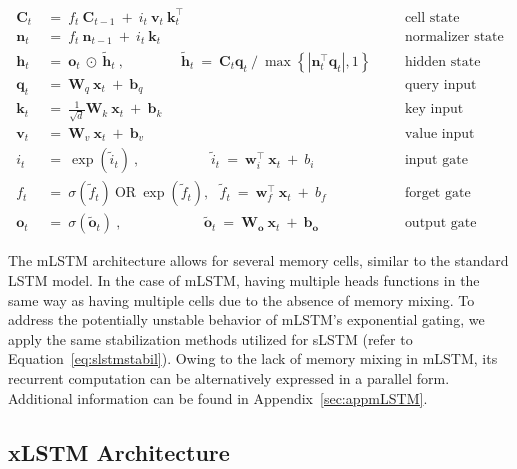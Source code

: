 \begin{align}
\label{eq:mlstm_recurrent_begin}
\mathbf{C}_t \ &= \  f_t \ \mathbf{C}_{t-1} \ + \ 
  i_t \ \mathbf{v}_t \ \mathbf{k}_t^\top & &  &\text{cell state} \\
\mathbf{n}_t \ &= \  f_t \ \mathbf{n}_{t-1} \ + \ 
  i_t \ \mathbf{k}_t & &  &\text{normalizer state} \\
\mathbf{h}_t  \ &= \ \mathbf{o}_t \ \odot \ \tilde{\mathbf{h}}_t
\ , \qquad \qquad 
\tilde{\mathbf{h}}_t \ = \   \mathbf{C}_t \mathbf{q}_t \ / \ 
  \max \left\{ |\mathbf{n}_t^\top \mathbf{q}_t|, 1 \right\} 
   &&&\text{hidden state} \\
\mathbf{q}_t \ &= \ \mathbf{W}_q \ \mathbf{x}_t \ + \ \mathbf{b}_q  & &  &\text{query input} \\
\mathbf{k}_t \ &= \ \frac{1}{\sqrt{d}} \mathbf{W}_k \ \mathbf{x}_t \ + \ \mathbf{b}_k  & &  &\text{key input} \\
\mathbf{v}_t \ &= \ \mathbf{W}_v \ \mathbf{x}_t \ + \ \mathbf{b}_v  & &  &\text{value input} \\
i_t \ &= \ \!\exp \!  \! \left( \tilde{i}_t  \right) \ , 
 \qquad \qquad \ \ \ \ \,
  \tilde{i}_t \ = \ \mathbf{w}^\top_{i} \ \mathbf{x}_t \ + \  b_{i} \ \ \ 
  &&&\text{input gate} \\
f_t \ &= \ \sigma \!  \left(  \tilde{f}_t \right) \ \text{OR} \ \!\exp \!  \! \left(  \tilde{f}_t \right) , \ \ \: \!
\tilde{f}_t \ = \ \mathbf{w}^\top_{f} \ \mathbf{x}_t  \ + \
  b_{f}
  &&& \text{forget gate} \\
\label{eq:mlstm_recurrent_end}
\mathbf{o}_t \ &= \ \sigma \left( \tilde{\mathbf{o}}_t \right) \ , \qquad \qquad \quad \ \ \ \,
  \tilde{\mathbf{o}}_t  \ = \ \mathbf{W}_{\mathbf{o}} \ \mathbf{x}_t \ + \
  \mathbf{b}_{\mathbf{o}}
  &&&\text{output gate} 
\end{align}

The mLSTM architecture allows for several memory cells, similar to the standard LSTM model. In the case of mLSTM, having multiple heads functions in the same way as having multiple cells due to the absence of memory mixing. To address the potentially unstable behavior of mLSTM's exponential gating, we apply the same stabilization methods utilized for sLSTM (refer to Equation~\ref{eq:slstmstabil}). 
Owing to the lack of memory mixing in mLSTM, its recurrent computation can be alternatively expressed in a parallel form. Additional information can be found in Appendix~\ref{sec:appmLSTM}.

\subsection{xLSTM Architecture}
\label{sec:xLSTMarch}

